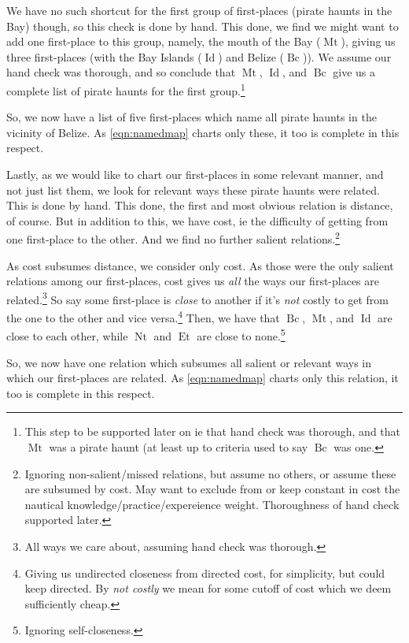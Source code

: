 \documentclass{amsart}
\newcommand{\ment}[1]{\textit{#1}} %
\DeclareMathOperator{\id}{Id} %
\DeclareMathOperator{\mt}{Mt} %
\DeclareMathOperator{\bc}{Bc} %
\DeclareMathOperator{\et}{Et} %
\DeclareMathOperator{\nt}{Nt} %
\theoremstyle{definition}
\theoremstyle{remark}
\begin{document}
			We have no such shortcut for the first group of first-places (pirate haunts in the Bay) though, so this check is done by hand. This done, we find we might want to add one first-place to this group, namely, the mouth of the Bay (\(\mt\)), giving us three first-places (with the Bay Islands (\(\id\)) and Belize (\(\bc\))). We assume our hand check was thorough, and so conclude that \(\mt\), \(\id\), and \(\bc\) give us a complete list of pirate haunts for the first group.\footnote{This step to be supported later on ie that hand check was thorough, and that \(\mt\) was a pirate haunt (at least up to criteria used to say \(\bc\) was one.}
		
			So, we now have a list of five first-places which name all pirate haunts in the vicinity of Belize. As \ref{eqn:namedmap} charts only these, it too is complete in this respect.
		
			Lastly, as we would like to chart our first-places in some relevant manner, and not just list them, we look for relevant ways these pirate haunts were related. This is done by hand. This done, the first and most obvious relation is distance, of course. But in addition to this, we have cost, ie the difficulty of getting from one first-place to the other. And we find no further salient relations.\footnote{Ignoring non-salient/missed relations, but assume no others, or assume these are subsumed by cost. May want to exclude from or keep constant in cost the nautical knowledge/practice/expereience weight. Thoroughness of hand check supported later.}
			
			As cost subsumes distance, we consider only cost. As those were the only salient relations among our first-places, cost gives us \emph{all} the ways our first-places are related.\footnote{All ways we care about, assuming hand check was thorough.} So say some first-place is \ment{close} to another if it's \emph{not} costly to get from the one to the other and vice versa.\footnote{Giving us undirected closeness from directed cost, for simplicity, but could keep directed. By \ment{not costly} we mean for some cutoff of cost which we deem sufficiently cheap.} Then, we have that \(\bc\), \(\mt\), and \(\id\) are close to each other, while \(\nt\) and \(\et\) are close to none.\footnote{Ignoring self-closeness.}
			
			So, we now have one relation which subsumes all salient or relevant ways in which our first-places are related. As \ref{eqn:namedmap} charts only this relation, it too is complete in this respect.
			
\end{document}
